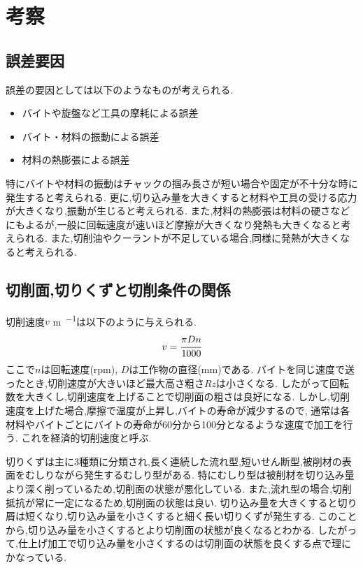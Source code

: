 \section{考察}
\subsection{誤差要因}
誤差の要因としては以下のようなものが考えられる.
\begin{itemize}
  \item バイトや旋盤など工具の摩耗による誤差
  \item バイト・材料の振動による誤差
  \item 材料の熱膨張による誤差
\end{itemize}
特にバイトや材料の振動はチャックの掴み長さが短い場合や固定が不十分な時に発生すると考えられる.
更に,切り込み量を大きくすると材料や工具の受ける応力が大きくなり,振動が生じると考えられる.
また,材料の熱膨張は材料の硬さなどにもよるが,一般に回転速度が速いほど摩擦が大きくなり発熱も大きくなると考えられる.
また,切削油やクーラントが不足している場合,同様に発熱が大きくなると考えられる.
\subsection{切削面,切りくずと切削条件の関係}
切削速度$v$ \si{\metre.\min^{-1}}は以下のように与えられる.\cite{unti}
\begin{align*}
  v=\cfrac{\pi Dn}{1000}
\end{align*}
ここで$n$は回転速度(rpm), $D$は工作物の直径(mm)である.
バイトを同じ速度で送ったとき,切削速度が大きいほど最大高さ粗さ$Rz$は小さくなる.\cite{rikougaku}
したがって回転数を大きくし,切削速度を上げることで切削面の粗さは良好になる.
しかし,切削速度を上げた場合,摩擦で温度が上昇し,バイトの寿命が減少するので,
通常は各材料やバイトごとにバイトの寿命が60分から100分となるような速度で加工を行う.
これを経済的切削速度と呼ぶ.\cite{unti}

切りくずは主に3種類に分類され,長く連続した流れ型,短いせん断型,被削材の表面をむしりながら発生するむしり型がある.\cite{197674}
特にむしり型は被削材を切り込み量より深く削っているため,切削面の状態が悪化している.
また,流れ型の場合,切削抵抗が常に一定になるため,切削面の状態は良い.
切り込み量を大きくすると切り屑は短くなり,切り込み量を小さくすると細く長い切りくずが発生する.\cite{osikko}
このことから,切り込み量を小さくするとより切削面の状態が良くなるとわかる.
したがって,仕上げ加工で切り込み量を小さくするのは切削面の状態を良くする点で理にかなっている.
